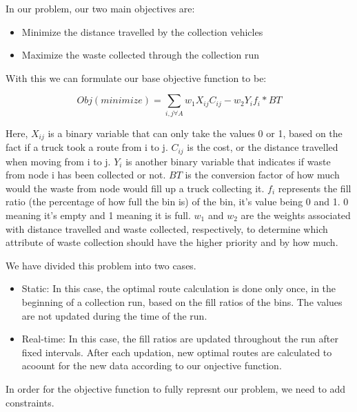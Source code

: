 \documentclass[12pt]{article}
\begin{document}
In our problem, our two main objectives are:
\begin{itemize}
    \item Minimize the distance travelled by the collection vehicles
    \item Maximize the waste collected through the collection run
\end{itemize}

With this we can formulate our base objective function to be:

\begin{equation}\label{eq1}
    Obj(minimize)=\sum_{i,j \forall A} w_1 X_{ij} C_{ij} - w_2 Y_i f_i * BT
\end{equation}

Here, $X_{ij}$ is a binary variable that can only take the values 0 or 1, based on the fact if a truck took a route from i to j. $C_{ij}$ is the cost, or the distance travelled when moving from i to j. $Y_{i}$ is another binary variable that indicates if waste from node i has been collected or not. $BT$ is the conversion factor of how much would the waste from node would fill up a truck collecting it. $f_i$ represents the fill ratio (the percentage of how full the bin is) of the bin, it's value being 0 and 1. 0 meaning it's empty and 1 meaning it is full. $w_1$ and $w_2$ are the weights associated with distance travelled and waste collected, respectively, to determine which attribute of waste collection should have the higher priority and by how much. 

We have divided this problem into two cases.
\begin{itemize}
    \item Static: In this case, the optimal route calculation is done only once, in the beginning of a collection run, based on the fill ratios of the bins. The values are not updated during the time of the run.
    \item Real-time: In this case, the fill ratios are updated throughout the run after fixed intervals. After each updation, new optimal routes are calculated to acoount for the new data according to our onjective function.
\end{itemize}

In order for the objective function to fully represnt our problem, we need to add constraints.
\end{document}
